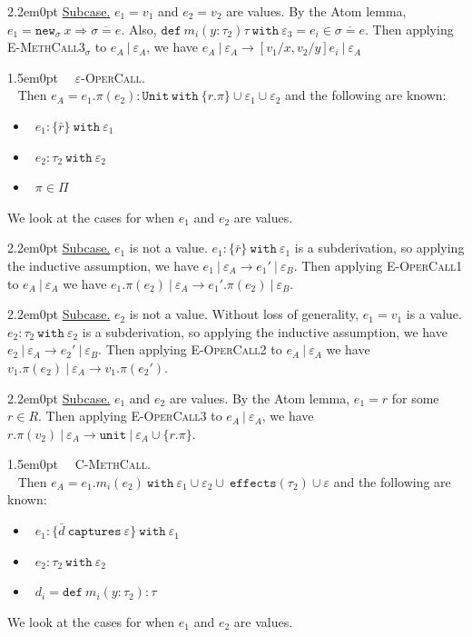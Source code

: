 \documentclass{llncs}
\newcommand{\keywadj}[1]{\mathtt{#1}}
\newcommand{\keyw}[1]{\keywadj{#1}~}
\newcommand{\proofcase}[2]{
	\begin{adjustwidth}{1.5em}{0pt}
		\fbox{Case.}~~#1. \\ ~#2
	\end{adjustwidth}
}
\newcommand{\subcase}[1] {
	\begin{adjustwidth}{2.2em}{0pt}
		\underline{Subcase.} #1
	\end{adjustwidth}
}
\begin{document}
{{			\subcase{ $e_1 = v_1$ and $e_2 = v_2$ are values. By the Atom lemma, $e_1 = \keywadj{new}_{\sigma}~x \Rightarrow \overline{\sigma = e}$. Also, $\keyw{def} m_i(y: \tau_2)  \tau~\keyw{with} \varepsilon_3 = e_i \in \overline{ \sigma = e }$. Then applying \textsc{E-MethCall3$_{\sigma}$} to $e_A~|~\varepsilon_A$, we have $e_A~|~\varepsilon_A \longrightarrow [v_1/x, v_2/y]e_i~|~\varepsilon_A$\\}

	}
	
	\proofcase{\textsc{$\varepsilon$-OperCall}} {
Then $e_A = e_1.\pi(e_2) : \keyw{Unit~with} \{ r. \pi \} \cup \varepsilon_1 \cup \varepsilon_2$ and the following are known:
\begin{itemize}
	\item~$e_1 : \{ \bar r \}~\keyw{with} \varepsilon_1$
	\item~$e_2 : \tau_2~\keyw{with} \varepsilon_2$
	\item~$\pi \in \Pi$
\end{itemize}
We look at the cases for when $e_1$ and $e_2$ are values.
	
		\subcase { $e_1$ is not a value. $e_1 : \{ \bar r \}~\keyw{with} \varepsilon_1$ is a subderivation, so applying the inductive assumption, we have $e_1~|~\varepsilon_A \longrightarrow e_1'~|~\varepsilon_B$. Then applying \textsc{E-OperCall1} to $e_A~|~\varepsilon_A$ we have $e_1.\pi(e_2)~|~\varepsilon_A \longrightarrow e_1'.\pi(e_2)~|~\varepsilon_B$.
		}
		
		\subcase { $e_2$ is not a value. Without loss of generality, $e_1 = v_1$ is a value. $e_2 : \tau_2~\keyw{with} \varepsilon_2$ is a subderivation, so applying the inductive assumption, we have $e_2~|~\varepsilon_A \longrightarrow e_2'~|~\varepsilon_B$. Then applying \textsc{E-OperCall2} to $e_A~|~\varepsilon_A$ we have $v_1.\pi(e_2)~|~\varepsilon_A \longrightarrow v_1.\pi(e_2')$. }
		
		\subcase { $e_1$ and $e_2$ are values. By the Atom lemma, $e_1 = r$ for some $r \in R$. Then applying \textsc{E-OperCall3} to $e_A~|~\varepsilon_A$, we have $r.\pi(v_2)~|~\varepsilon_A \longrightarrow \keywadj{unit}~|~\varepsilon_A \cup \{ r.\pi \}$.\\}
		
	}
	
	\proofcase{\textsc{C-MethCall}} {
Then $e_A = e_1.m_i(e_2)~\keyw{with} \varepsilon_1 \cup \varepsilon_2 \cup~\keywadj{effects}(\tau_2) \cup \varepsilon$ and the following are known:

\begin{itemize}
	\item ~$e_1 : \{ \bar d~\keyw{captures} \varepsilon \}~\keywadj{with}~\varepsilon_1$
	\item ~$e_2 : \tau_2~\keyw{with} \varepsilon_2$
	\item ~$d_i = \keyw{def} m_i(y : \tau_2) : \tau$
\end{itemize}
	We look at the cases for when $e_1$ and $e_2$ are values.
	
}}
\end{document}
